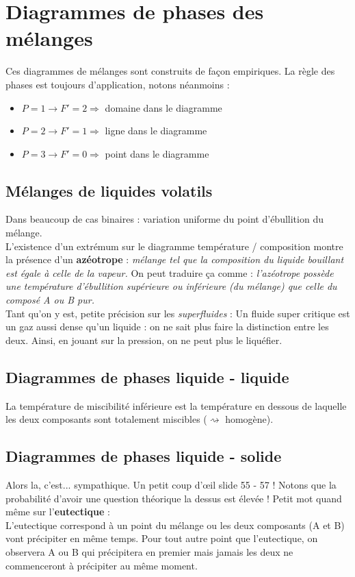 \documentclass	[11pt, a4paper, openany]{book}
\begin{document}
\section{Diagrammes de phases des mélanges}
Ces diagrammes de mélanges sont construits de façon empiriques. La règle des phases est toujours d'application, notons néanmoins : 
\begin{itemize}
	\item $P = 1 \rightarrow F' = 2 \Rightarrow$ domaine dans le diagramme
	\item $P = 2 \rightarrow F' = 1 \Rightarrow$ ligne dans le diagramme
	\item $P = 3 \rightarrow F' = 0 \Rightarrow$ point dans le diagramme
\end{itemize}
\subsection{Mélanges de liquides volatils}
Dans beaucoup de cas binaires : variation uniforme du point d'ébullition du mélange.\\
L'existence d'un extrémum sur le diagramme température / composition montre la présence d'un \textbf{azéotrope} : \textit{mélange tel que la composition du liquide bouillant est égale à celle de la vapeur.} On peut traduire ça comme : \textit{l'azéotrope possède une température d'ébullition supérieure ou inférieure (du mélange) que celle du composé A ou B pur.}\\

Tant qu'on y est, petite précision sur les \textit{superfluides} : Un fluide super critique est un gaz aussi dense qu'un liquide : on ne sait plus faire la distinction entre les deux. Ainsi, en jouant sur la pression, on ne peut plus le liquéfier.

\subsection{Diagrammes de phases liquide - liquide}
La température de miscibilité inférieure est la température en dessous de laquelle les deux composants sont totalement miscibles ($\rightsquigarrow$ homogène).

\subsection{Diagrammes de phases liquide - solide}
Alors la, c'est... sympathique. Un petit coup d'œil slide 55 - 57 ! Notons que la probabilité d'avoir une question théorique la dessus est élevée ! Petit mot quand même sur l'\textbf{eutectique} :\\
L'eutectique correspond à un point du mélange ou les deux composants (A et B) vont précipiter en même temps. Pour tout autre point que l'eutectique, on observera A ou B qui précipitera en premier mais jamais les deux ne commenceront à précipiter au même moment.
\end{document}
